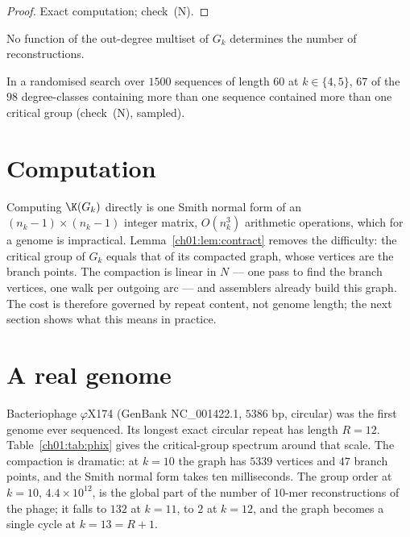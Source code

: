 \begin{proof}
Exact computation; check~(N).
\end{proof}

\begin{corollary}\label{ch01:cor:insufficient}
No function of the out-degree multiset of $G_k$ determines the number of reconstructions.
\end{corollary}

In a randomised search over $1500$ sequences of length $60$ at $k\in\{4,5\}$, $67$ of the
$98$ degree-classes containing more than one sequence contained more than one critical
group (check~(N), sampled).

\section{Computation}\label{ch01:sec:compute}

Computing $\K(G_k)$ directly is one Smith normal form of an $(n_k-1)\times(n_k-1)$ integer
matrix, $O(n_k^{3})$ arithmetic operations, which for a genome
is impractical. Lemma~\ref{ch01:lem:contract} removes the difficulty: the critical group of $G_k$
equals that of its compacted graph, whose vertices are the branch points. The compaction is
linear in $N$ --- one pass to find the branch vertices, one walk per outgoing arc --- and
assemblers already build this graph. The cost is therefore governed by repeat content, not
genome length; the next section shows what this means in practice.

\section{A real genome}\label{ch01:sec:real}

Bacteriophage $\varphi$X174 (GenBank NC\_001422.1, $5386$ bp, circular) was the first
genome ever sequenced. Its longest exact circular repeat has length $R=12$.
Table~\ref{ch01:tab:phix} gives the critical-group spectrum around that scale. The compaction
is dramatic: at $k=10$ the graph has $5339$ vertices and $47$ branch points, and the Smith
normal form takes ten milliseconds. The group order at $k=10$, $4.4\times10^{12}$, is the
global part of the number of $10$-mer reconstructions of the phage; it falls to $132$ at
$k=11$, to $2$ at $k=12$, and the graph becomes a single cycle at $k=13=R+1$.

